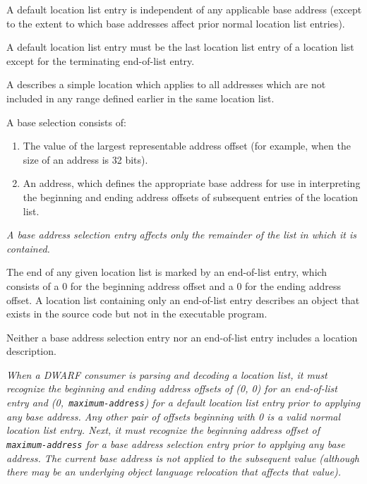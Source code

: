 A default location list entry is independent of any applicable
base address (except to the extent to which base addresses
affect prior normal location list entries).

A default location list entry must be the last location list
entry of a location list except for the terminating end-of-list
entry.

A  describes a simple 
location which applies to all addresses which are not included 
in any range defined earlier in the same location list.

A base 
selection 
consists of:
\begin{enumerate}[1. ]
\item The value of the largest representable 
address offset (for example, \wffffffff when the size of
an address is 32 bits).
\item An address, which defines the 
appropriate base address for use in interpreting the beginning
and ending address offsets of subsequent entries of the location list.
\end{enumerate}

\textit{A base address selection entry 
affects only the remainder of the list in which it is contained.}

The end of any given location list is marked by an 
end-of-list entry, which consists of a 0 for the beginning address
offset and a 0 for the ending address offset. A location list
containing only an 
end-of-list entry describes an object that
exists in the source code but not in the executable program.

Neither a base address selection entry nor an end-of-list
entry includes a location description.

\textit{When a DWARF consumer is parsing and decoding a location
list, it must recognize the beginning and ending address
offsets of (0, 0) for an end-of-list entry and 
\mbox{(0, \texttt{maximum-address})} for
a default location list entry prior to applying any base
address. Any other pair of offsets beginning with 0 is a
valid normal location list entry. Next, it must recognize the
beginning address offset of \texttt{maximum-address} for a base address selection
entry prior to applying any base address. The current base
address is not applied to the subsequent value (although there
may be an underlying object language relocation that affects
that value).}

